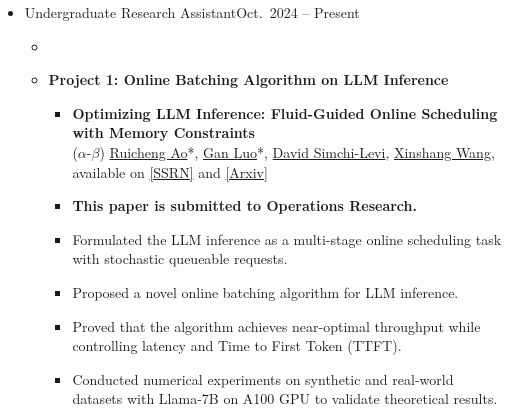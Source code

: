 \begin{itemize}
    \item {}
          {Undergraduate Research Assistant}{Oct.\ 2024 -- Present}
          \begin{itemize}
              \item {}
              \item \textbf{Project 1: Online Batching Algorithm on LLM Inference}
              \begin{itemize}
                \item \textbf{Optimizing LLM Inference: Fluid-Guided Online Scheduling with Memory Constraints}\\
    ($\alpha$-$\beta$) \href{https://www.mit.edu/~aorc/index.html}{Ruicheng Ao}*, \underline{Gan Luo}*, \href{https://slevi1.mit.edu}{David Simchi-Levi}, \href{https://www.columbia.edu/~xw2230/}{Xinshang Wang}, available on \href{https://papers.ssrn.com/sol3/papers.cfm?abstract_id=5195463}{[SSRN]} and \href{https://arxiv.org/abs/2504.11320}{[Arxiv]}
                  \item {\textbf{This paper is submitted to Operations Research.}}
                  \item {Formulated the LLM inference as a multi-stage online scheduling task with stochastic queueable requests.}
                  \item {Proposed a novel online batching algorithm for LLM inference.}
                  \item {Proved that the algorithm achieves near-optimal throughput while controlling latency and Time to First Token (TTFT).}
                  \item {Conducted numerical experiments on synthetic and real-world datasets with Llama-7B on A100 GPU to validate theoretical results.}
              \end{itemize}
          \end{itemize}
          
          
\end{itemize}